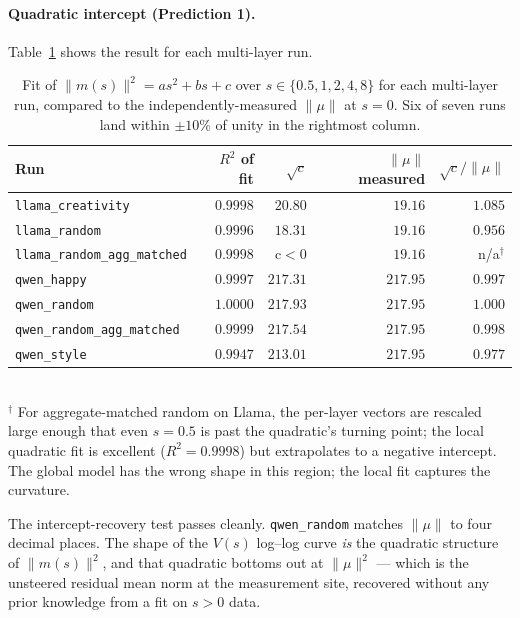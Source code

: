 \paragraph{Quadratic intercept (Prediction 1).}
Table~\ref{tab:walk-sqrtc} shows the result for each multi-layer run.

\begin{table}[htbp]
  \centering
  \small
  \caption{Fit of $\|m(s)\|^2 = a s^2 + b s + c$ over $s \in \{0.5, 1, 2, 4, 8\}$ for each multi-layer run, compared to the independently-measured $\|\mu\|$ at $s = 0$. Six of seven runs land within $\pm 10\%$ of unity in the rightmost column.}
  \label{tab:walk-sqrtc}
  \begin{tabular}{@{}lrrrr@{}}
    \toprule
    Run & $R^2$ of fit & $\sqrt{c}$ & $\|\mu\|$ measured & $\sqrt{c} / \|\mu\|$ \\
    \midrule
    \texttt{llama\_creativity} & $0.9998$ & $20.80$ & $19.16$ & $1.085$ \\
    \texttt{llama\_random} & $0.9996$ & $18.31$ & $19.16$ & $0.956$ \\
    \texttt{llama\_random\_agg\_matched} & $0.9998$ & $\text{c}<0$ & $19.16$ & n/a$^\dagger$ \\
    \texttt{qwen\_happy} & $0.9997$ & $217.31$ & $217.95$ & $0.997$ \\
    \texttt{qwen\_random} & $1.0000$ & $217.93$ & $217.95$ & $1.000$ \\
    \texttt{qwen\_random\_agg\_matched} & $0.9999$ & $217.54$ & $217.95$ & $0.998$ \\
    \texttt{qwen\_style} & $0.9947$ & $213.01$ & $217.95$ & $0.977$ \\
    \bottomrule
  \end{tabular}
  \\[2pt]
  {\footnotesize
  $^\dagger$ For aggregate-matched random on Llama, the per-layer vectors are
  rescaled large enough that even $s = 0.5$ is past the quadratic's turning
  point; the local quadratic fit is excellent ($R^2 = 0.9998$) but extrapolates
  to a negative intercept. The global model has the wrong shape in this
  region; the local fit captures the curvature.}
\end{table}

The intercept-recovery test passes cleanly. \texttt{qwen\_random} matches
$\|\mu\|$ to four decimal places. The shape of the $V(s)$ log--log curve
\emph{is} the quadratic structure of $\|m(s)\|^2$, and that quadratic bottoms
out at $\|\mu\|^2$ --- which is the unsteered residual mean norm at the
measurement site, recovered without any prior knowledge from a fit on
$s > 0$ data.

